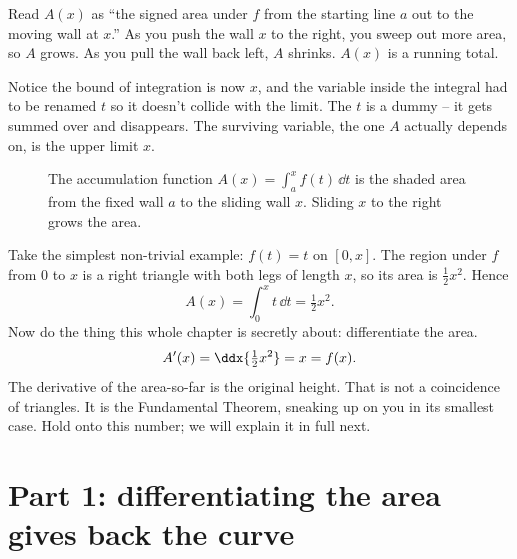 \begin{focusbox}
Read $A(x)$ as ``the signed area under $f$ from the starting line $a$ out to the
moving wall at $x$.'' As you push the wall $x$ to the right, you sweep out more
area, so $A$ grows. As you pull the wall back left, $A$ shrinks. $A(x)$ is a
running total.

Notice the bound of integration is now $x$, and the variable inside the integral
had to be renamed $t$ so it doesn't collide with the limit. The $t$ is a dummy --
it gets summed over and disappears. The surviving variable, the one $A$ actually
depends on, is the upper limit $x$.
\end{focusbox}

\begin{figure}[H]
\centering
{}
\caption{The accumulation function $A(x)=\int_a^x f(t)\,\dd t$ is the shaded area
from the fixed wall $a$ to the sliding wall $x$. Sliding $x$ to the right grows
the area.}
\label{ch21:fig-accum}
\end{figure}

\begin{labbox}
Take the simplest non-trivial example: $f(t)=t$ on $[0,x]$. The region under
$f$ from $0$ to $x$ is a right triangle with both legs of length $x$, so its
area is $\tfrac12 x^2$. Hence
\[
  A(x) = \int_0^x t\,\dd t = \tfrac12 x^2 .
\]
Now do the thing this whole chapter is secretly about: differentiate the area.
\[
  A'(x) = \ddx{\tfrac12 x^2} = x = f(x).
\]
The derivative of the area-so-far is the original height. That is not a
coincidence of triangles. It is the Fundamental Theorem, sneaking up on you in
its smallest case. Hold onto this number; we will explain it in full next.
\end{labbox}

\section{Part 1: differentiating the area gives back the curve}

